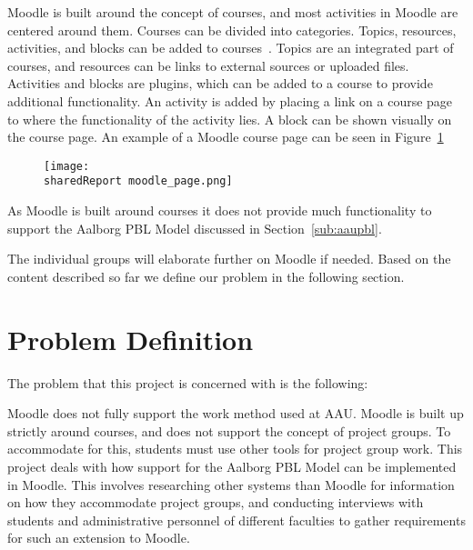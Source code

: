 Moodle is built around the concept of courses, and most activities in Moodle are centered around them.
Courses can be divided into categories.
Topics, resources, activities, and blocks can be added to courses~\citep{moodleStructural}.
Topics are an integrated part of courses, and resources can be links to external sources or uploaded files.
Activities and blocks are plugins, which can be added to a course to provide additional functionality.
An activity is added by placing a link on a course page to where the functionality of the activity lies.
A block can be shown visually on the course page.
An example of a Moodle course page can be seen in Figure~\ref{fig:MoodleCourse}

\begin{figure}
\texttt{[image: \\sharedReport moodle\_page.png]}
\label{fig:MoodleCourse}
\end{figure}

As Moodle is built around courses it does not provide much functionality to support the Aalborg PBL Model discussed in Section~\ref{sub:aaupbl}.

The individual groups will elaborate further on Moodle if needed.
Based on the content described so far we define our problem in the following section.

\section{Problem Definition}
\label{sec:problemDef}
The problem that this project is concerned with is the following:

Moodle does not fully support the work method used at AAU.
Moodle is built up strictly around courses, and does not support the concept of project groups.
To accommodate for this, students must use other tools for project group work.
This project deals with how support for the Aalborg PBL Model can be implemented in Moodle.
This involves researching other systems than Moodle for information on how they accommodate project groups, and conducting interviews with students and administrative personnel of different faculties to gather requirements for such an extension to Moodle.
